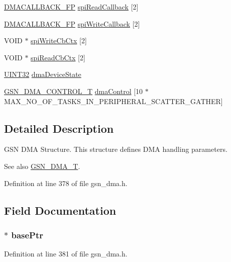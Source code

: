 \begin{DoxyCompactItemize}
\hyperlink{a00484_a74d23c3cb3acf00134600795aef55b6e}{DMACALLBACK\_\-FP} \hyperlink{a00049_a17036a9850efdc366d026fa74a76f92b}{spiReadCallback} \mbox{[}2\mbox{]}
\item 
\hyperlink{a00484_a74d23c3cb3acf00134600795aef55b6e}{DMACALLBACK\_\-FP} \hyperlink{a00049_ade41b4d2f83ca1006ff0d8f85da8ac8c}{spiWriteCallback} \mbox{[}2\mbox{]}
\item 
VOID $\ast$ \hyperlink{a00049_a4984962173c9e9fe0bd92332ea75a95e}{spiWriteCbCtx} \mbox{[}2\mbox{]}
\item 
VOID $\ast$ \hyperlink{a00049_a310078ceadd325955bf78bccf87e4808}{spiReadCbCtx} \mbox{[}2\mbox{]}
\item 
\hyperlink{a00660_gae1e6edbbc26d6fbc71a90190d0266018}{UINT32} \hyperlink{a00049_a7238ebf9ce9010563ba1c1a3852df6b4}{dmaDeviceState}
\item 
\hyperlink{a00050}{GSN\_\-DMA\_\-CONTROL\_\-T} \hyperlink{a00049_aef9027f3e52eb0793e06c4895858e86e}{dmaControl} \mbox{[}10 $\ast$MAX\_\-NO\_\-OF\_\-TASKS\_\-IN\_\-PERIPHERAL\_\-SCATTER\_\-GATHER\mbox{]}
\end{DoxyCompactItemize}


\subsection{Detailed Description}
GSN DMA Structure. This structure defines DMA handling parameters. 

\begin{DoxySeeAlso}{See also}
\hyperlink{a00645_ga61edafecbc46e3ba81ec48b9cf3aa1fa}{GSN\_\-DMA\_\-T}. 
\end{DoxySeeAlso}


Definition at line 378 of file gsn\_\-dma.h.



\subsection{Field Documentation}
\hypertarget{a00049_aec2f3ffcdad505b0a8d4a1f16e30849b}{
\subsubsection[{basePtr}]{$\ast$ {\bf basePtr}}}
\label{a00049_aec2f3ffcdad505b0a8d4a1f16e30849b}


Definition at line 381 of file gsn\_\-dma.h.

